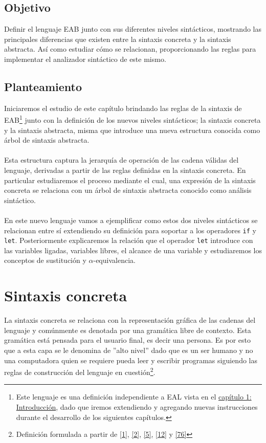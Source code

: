 \subsection*{Objetivo}
Definir el lenguaje \textsf{EAB} junto con sus diferentes niveles sintácticos, mostrando las principales diferencias que existen entre la sintaxis concreta y la sintaxis abstracta. Así como estudiar cómo se relacionan, proporcionando las reglas para implementar el analizador sintáctico de este mismo.

\subsection*{Planteamiento}
Iniciaremos el estudio de este capítulo brindando las reglas de la sintaxis de \textsf{EAB}\footnote{Este lenguaje es una definición independiente a \textsf{EAL} vista en el \hyperref[sec:intro]{capítulo 1: Introducción}, dado que iremos extendiendo y agregando nuevas instrucciones durante el desarrollo de los siguientes capítulos.} junto con la definición de los nuevos niveles sintácticos; la sintaxis concreta y la sintaxis abstracta, misma que introduce una nueva estructura conocida como árbol de sintaxis abstracta.\\\\
 Esta estructura captura la jerarquía de operación de las cadena válidas del lenguaje, derivadas a partir de las reglas definidas en la sintaxis concreta. En particular estudiaremos el proceso mediante el cual, una expresión de la sintaxis concreta se relaciona con un árbol de sintaxis abstracta conocido como análisis sintáctico. \\\\
En este nuevo lenguaje vamos a ejemplificar como estos dos niveles sintácticos se relacionan entre sí extendiendo su definición para soportar a los operadores \texttt{if} y \texttt{let}. 
Posteriormente explicaremos la relación que el operador \texttt{let} introduce con las variables ligadas, variables libres, el alcance de una variable y estudiaremos los conceptos de sustitución y $\alpha$-equivalencia.

\section{Sintaxis concreta}

    La sintaxis concreta se relaciona con la representación gráfica de las cadenas del lenguaje y comúnmente es denotada por una gramática libre de contexto. Esta gramática está pensada para el usuario final, es decir una persona. Es por esto que a esta capa se le denomina de ''alto nivel'' dado que es un ser humano y no una computadora quien se requiere pueda leer y escribir programas siguiendo las reglas de construcción del lenguaje en cuestión\footnote{Definición formulada a partir de \hyperlink{1}{[1]}, \hyperlink{2}{[2]}, \hyperlink{5}{[5]}, \hyperlink{12}{[12]} y \hyperlink{76}{[76]}}.

